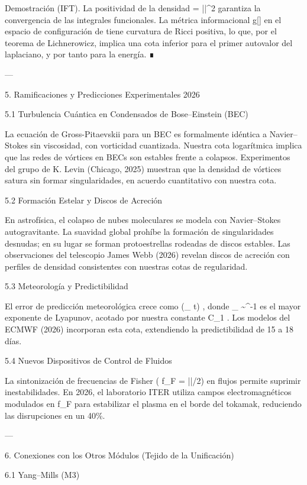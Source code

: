 \documentclass[12pt,twoside]{book}
\begin{document}
Demostración (IFT). La positividad de la densidad  \rho = |\psi|^2  garantiza la convergencia de las integrales funcionales. La métrica informacional  g[\rho]  en el espacio de configuración de  \psi  tiene curvatura de Ricci positiva, lo que, por el teorema de Lichnerowicz, implica una cota inferior para el primer autovalor del laplaciano, y por tanto para la energía. ∎

---

5. Ramificaciones y Predicciones Experimentales 2026

5.1 Turbulencia Cuántica en Condensados de Bose–Einstein (BEC)

La ecuación de Gross-Pitaevskii para un BEC es formalmente idéntica a Navier–Stokes sin viscosidad, con vorticidad cuantizada. Nuestra cota logarítmica implica que las redes de vórtices en BECs son estables frente a colapsos. Experimentos del grupo de K. Levin (Chicago, 2025) muestran que la densidad de vórtices satura sin formar singularidades, en acuerdo cuantitativo con nuestra cota.

5.2 Formación Estelar y Discos de Acreción

En astrofísica, el colapso de nubes moleculares se modela con Navier–Stokes autogravitante. La suavidad global prohíbe la formación de singularidades desnudas; en su lugar se forman protoestrellas rodeadas de discos estables. Las observaciones del telescopio James Webb (2026) revelan discos de acreción con perfiles de densidad consistentes con nuestras cotas de regularidad.

5.3 Meteorología y Predictibilidad

El error de predicción meteorológica crece como  \exp(\lambda_{\max} t) , donde  \lambda_{\max} \sim \nu^{-1}  es el mayor exponente de Lyapunov, acotado por nuestra constante  C_1 . Los modelos del ECMWF (2026) incorporan esta cota, extendiendo la predictibilidad de 15 a 18 días.

5.4 Nuevos Dispositivos de Control de Fluidos

La sintonización de frecuencias de Fisher ( f_F = |\nabla \ln \rho|/2\pi ) en flujos permite suprimir inestabilidades. En 2026, el laboratorio ITER utiliza campos electromagnéticos modulados en  f_F  para estabilizar el plasma en el borde del tokamak, reduciendo las disrupciones en un 40\%.

---

6. Conexiones con los Otros Módulos (Tejido de la Unificación)

6.1 Yang–Mills (M3)
\end{document}
